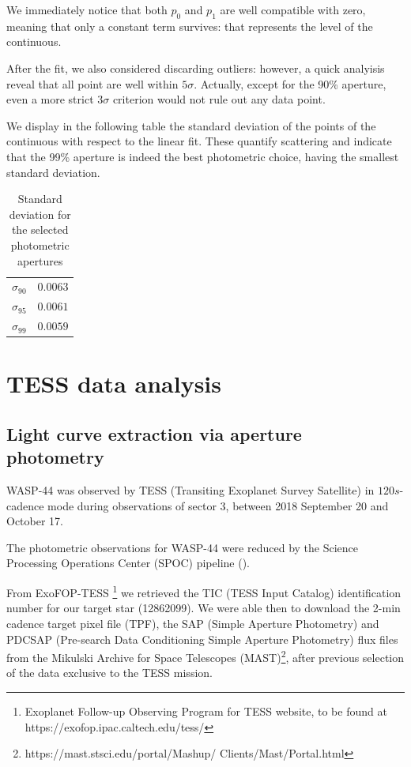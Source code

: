\documentclass[a4paper,11pt,twocolumn]{article}
\begin{document}
We immediately notice that both $p_0$ and $p_1$ are well compatible with zero,
meaning that only a constant term survives: that represents the level of the 
continuous. 

After the fit, we also considered discarding outliers: however, a quick 
analyisis reveal that all point are well within $5\sigma$. Actually, 
except for the 90\% aperture, even a more strict $3\sigma$ criterion 
would not rule out any data point.

We display in %
the following table the standard deviation of the points of the 
continuous with respect to the linear fit. These quantify scattering and 
indicate that the 99\% aperture is indeed the best photometric choice, 
having the smallest standard deviation.
\begin{table}[h!]
   \centering
    \begin{tabular}{cc}
    \hline
    $\sigma_{90}$ & $0.0063$ \\
    $\sigma_{95}$ & $0.0061$ \\
    $\sigma_{99}$ & $0.0059$ \\
    \hline
    \end{tabular}
    \caption{Standard deviation for the selected photometric apertures}
\end{table}





\section{TESS data analysis}



\subsection{Light curve extraction via aperture photometry}

WASP-44 was observed by TESS (Transiting Exoplanet Survey Satellite) in $120 s$-cadence mode during observations of sector 3, between 2018 September 20 and October 17.

The photometric observations for WASP-44 were reduced by the Science Processing Operations Center (SPOC) pipeline (\cite{Jenkins}).

From ExoFOP-TESS \footnote{Exoplanet Follow-up Observing Program for TESS website, to be found at https://exofop.ipac.caltech.edu/tess/} 
we retrieved the TIC (TESS Input Catalog) identification number for our target star (12862099).
We were able then to download the 2-min cadence target pixel file (TPF), the SAP (Simple Aperture Photometry) and 
PDCSAP (Pre-search Data Conditioning Simple Aperture Photometry) flux files from the Mikulski Archive for Space 
Telescopes (MAST)\footnote{https://mast.stsci.edu/portal/Mashup/ Clients/Mast/Portal.html}, after previous selection 
of the data exclusive to the TESS mission.
\end{document}
